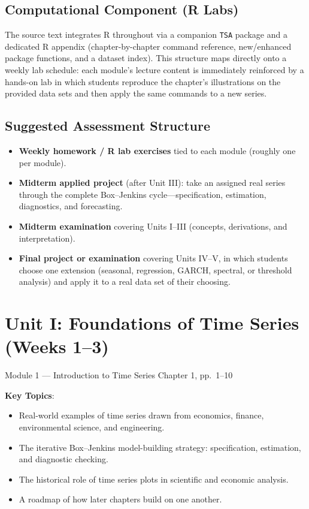 \documentclass[11pt]{article}
\newcommand{\keytopics}{\textbf{\color{modblue}Key Topics}}
\begin{document}
\subsection{Computational Component (R Labs)}
The source text integrates R throughout via a companion \texttt{TSA} package and a dedicated R appendix (chapter-by-chapter command reference, new/enhanced package functions, and a dataset index). This structure maps directly onto a weekly lab schedule: each module's lecture content is immediately reinforced by a hands-on lab in which students reproduce the chapter's illustrations on the provided data sets and then apply the same commands to a new series.

\subsection{Suggested Assessment Structure}
\begin{itemize}
  \item \textbf{Weekly homework / R lab exercises} tied to each module (roughly one per module).
  \item \textbf{Midterm applied project} (after Unit III): take an assigned real series through the complete Box--Jenkins cycle---specification, estimation, diagnostics, and forecasting.
  \item \textbf{Midterm examination} covering Units I--III (concepts, derivations, and interpretation).
  \item \textbf{Final project or examination} covering Units IV--V, in which students choose one extension (seasonal, regression, GARCH, spectral, or threshold analysis) and apply it to a real data set of their choosing.
\end{itemize}

\newpage
\section{Unit I: Foundations of Time Series (Weeks 1--3)}

\begin{moduletitle}{Module 1 --- Introduction to Time Series}
\small Chapter 1, pp.\ 1--10
\end{moduletitle}

\keytopics:
\begin{itemize}
  \item Real-world examples of time series drawn from economics, finance, environmental science, and engineering.
  \item The iterative Box--Jenkins model-building strategy: specification, estimation, and diagnostic checking.
  \item The historical role of time series plots in scientific and economic analysis.
  \item A roadmap of how later chapters build on one another.
\end{itemize}
\end{document}
